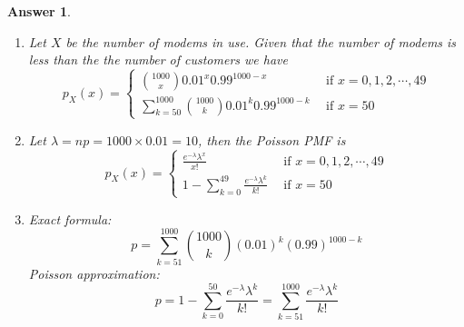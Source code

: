 \documentclass[utf8]{article}
\theoremstyle{definition}%
\theoremstyle{plain}%
\newtheorem{answer}{Answer} %
\begin{document}
\begin{answer} ~
    \begin{enumerate}[label=(\alph*)]
        \item Let $X$ be the number of modems in use. Given that the number of modems is less than the the number of customers we have
        \begin{equation}
            p_X(x) = \left\{
            \begin{aligned}
                \binom{1000}{x} 0.01^x 0.99^{1000 - x}~~& \text{if } x = 0,1,2,\cdots,49 \\
                \sum_{k=50}^{1000} \binom{1000}{k} 0.01^k 0.99^{1000 - k}~~& \text{if } x = 50
            \end{aligned}\right.
        \end{equation}
        \item Let $\lambda = np = 1000 \times 0.01 = 10$, then the Poisson PMF is
        \begin{equation}
            p_X(x) = \left\{
            \begin{aligned}
                \frac{e^{-\lambda} \lambda^x}{x!}~~& \text{if } x = 0,1,2,\cdots,49 \\
                1 - \sum_{k=0}^{49} \frac{e^{-\lambda} \lambda^k}{k!}~~& \text{if } x = 50
            \end{aligned}\right.
        \end{equation}
        \item Exact formula:
        \begin{equation}
            p = \sum_{k=51}^{1000} \binom{1000}{k} (0.01)^k (0.99)^{1000 - k}
        \end{equation}
        Poisson approximation:
        \begin{equation}
            p = 1 - \sum_{k=0}^{50} \frac{e^{-\lambda} \lambda^k}{k!} = \sum_{k=51}^{1000} \frac{e^{-\lambda} \lambda^k}{k!}
        \end{equation}
    \end{enumerate}
\end{answer}
\end{document}
